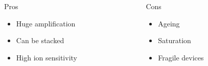 \begin{frame}[t]
  \begin{columns}
    \begin{column}{0.45\textwidth}
      \begin{block}{Pros}
        \begin{itemize}
          \item Huge amplification
          \item Can be stacked
          \item High ion sensitivity
        \end{itemize}
      \end{block}
    \end{column}
    \begin{column}{0.45\textwidth}
      \begin{block}{Cons}
        \begin{itemize}
          \item Ageing
          \item Saturation
          \item Fragile devices
        \end{itemize}
      \end{block}
    \end{column}
  \end{columns}
\end{frame}

